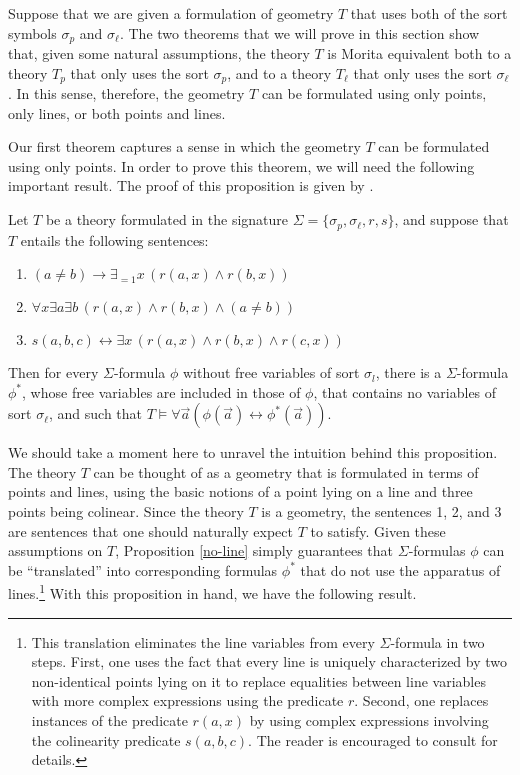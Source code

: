 Suppose that we are given a formulation of geometry $T$ that uses both
of the sort symbols $\sigma_p$ and $\sigma_\ell$. The two theorems
that we will prove in this section show that, given some natural
assumptions, the theory $T$ is Morita equivalent both to a theory
$T_p$ that only uses the sort $\sigma_p$, and to a theory $T_\ell$
that only uses the sort $\sigma_\ell$. In this sense, therefore, the
geometry $T$ can be formulated using only points, only lines, or both
points and lines.

Our first theorem captures a sense in which the geometry $T$ can be
formulated using only points. In order to prove this theorem, we will
need the following important result. The proof of this proposition is
given by \citet[Proposition 4.59]{schwabhauser1983}.

\begin{prop} \label{no-line}
Let $T$ be a theory formulated in the signature $\Sigma =\{\sigma _p,\sigma _\ell ,r,s\}$, and suppose that $T$ entails the following sentences:
\begin{enumerate}
\item $(a\neq b)\to\exists _{=1}x\,(r(a,x)\wedge r(b,x))$
\item $\forall x\exists a\exists b\,(r(a,x)\wedge r(b,x)\wedge (a\neq
  b))$
\item $s(a,b,c)\leftrightarrow \exists x\,(r(a,x)\wedge r(b,x)\wedge
  r(c,x))$
\end{enumerate} 
Then for every $\Sigma$-formula $\phi$ without free variables of sort
$\sigma _l$, there is a $\Sigma$-formula $\phi ^*$, whose free
variables are included in those of $\phi$, that contains no variables
of sort $\sigma _{\ell}$, and such that
$T\vDash \forall \vec{a}(\phi (\vec{a})\leftrightarrow
\phi^*(\vec{a})).$
\end{prop}
We should take a moment here to unravel the intuition behind this
proposition. The theory $T$ can be thought of as a geometry that is
formulated in terms of points and lines, using the basic notions of a
point lying on a line and three points being colinear. Since the
theory $T$ is a geometry, the sentences 1, 2, and 3 are sentences that
one should naturally expect $T$ to satisfy. Given these assumptions on
$T$, Proposition \ref{no-line} simply guarantees that
$\Sigma$-formulas $\phi$ can be ``translated'' into corresponding
formulas $\phi^*$ that do not use the apparatus of
lines.\footnote{This translation eliminates the line variables from
  every $\Sigma$-formula in two steps. First, one uses the fact that
  every line is uniquely characterized by two non-identical points
  lying on it to replace equalities between line variables with more
  complex expressions using the predicate $r$. Second, one replaces
  instances of the predicate $r(a,x)$ by using complex expressions
  involving the colinearity predicate $s(a,b,c)$. The reader is
  encouraged to consult \citet[Proposition 4.59]{schwabhauser1983} for
  details.} With this proposition in hand, we have the following
result.

